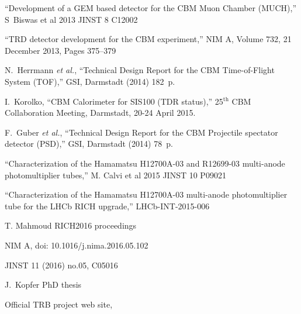 \begin{thebibliography}{99}
``Development of a GEM based detector for the CBM Muon Chamber (MUCH),''
S~Biswas et al 2013 JINST 8 C12002

``TRD detector development for the CBM experiment,''
NIM A, Volume 732, 21 December 2013, Pages 375–379

N.~Herrmann {\it et al.}, ``Technical Design Report for the CBM Time-of-Flight System (TOF),'' GSI, Darmstadt (2014) 182~p.

I.~Korolko, ``CBM Calorimeter for SIS100 (TDR status),'' 25$^\mathrm{th}$ CBM Collaboration Meeting, Darmstadt, 20-24 April 2015.\\

F.~Guber {\it et al.}, ``Technical Design Report for the CBM Projectile spectator detector (PSD),'' GSI, Darmstadt (2014) 78~p.



``Characterization of the Hamamatsu H12700A-03 and R12699-03 multi-anode photomultiplier tubes,''
M. Calvi et al 2015 JINST 10 P09021 

``Characterization of the Hamamatsu H12700A-03 multi-anode photomultiplier tube for the LHCb RICH upgrade,''
LHCb-INT-2015-006


T. Mahmoud RICH2016 proceedings

NIM A, doi: 10.1016/j.nima.2016.05.102

JINST 11 (2016) no.05, C05016

J.~Kopfer PhD thesis


Official TRB project web site,


\end{thebibliography}

